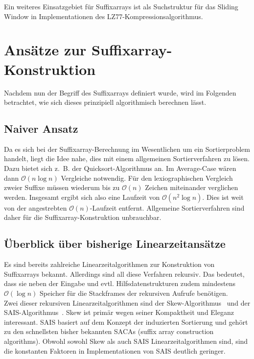 \documentclass[twoside,a4paper,11pt]{article}
\theoremstyle{break}
\begin{document}
Ein weiteres Einsatzgebiet für Suffixarrays ist als Suchstruktur für das Sliding Window in Implementationen des LZ77-Kompressionsalgorithmus.

\section{Ansätze zur Suffixarray-Konstruktion}

Nachdem nun der Begriff des Suffixarrays definiert wurde, wird im Folgenden betrachtet, wie sich dieses prinzipiell algorithmisch berechnen lässt.

\subsection{Naiver Ansatz}

Da es sich bei der Suffixarray-Berechnung im Wesentlichen um ein Sortierproblem handelt, liegt die Idee nahe, dies mit einem allgemeinen Sortierverfahren zu lösen. Dazu bietet sich z.~B. der Quicksort-Algorithmus an. Im Average-Case wären dann $\mathcal{O}(n \log n)$ Vergleiche notwendig. Für den lexiographischen Vergleich zweier Suffixe müssen wiederum bis zu $\mathcal{O}(n)$ Zeichen miteinander verglichen werden. Insgesamt ergibt sich also eine Laufzeit von $\mathcal{O}(n^2 \log n)$. Dies ist weit von der angestrebten $\mathcal{O}(n)$-Laufzeit entfernt. Allgemeine Sortierverfahren sind daher für die Suffixarray-Konstruktion unbrauchbar.

\subsection{Überblick über bisherige Linearzeitansätze}

Es sind bereits zahlreiche Linearzeitalgorithmen zur Konstruktion von Suffixarrays bekannt. Allerdings sind all diese Verfahren rekursiv. Das bedeutet, dass sie neben der Eingabe und evtl. Hilfsdatenstrukturen zudem mindestens $\mathcal{O}(\log n)$ Speicher für die Stackframes der rekursiven Aufrufe benötigen.\\

Zwei dieser rekursiven Linearzeitalgorithmen sind der Skew-Algorithmus~\cite{skew} und der SAIS-Algorithmus~\cite{sais}. Skew ist primär wegen seiner Kompaktheit und Eleganz interessant. SAIS basiert auf dem Konzept der induzierten Sortierung und gehört zu den schnellsten bisher bekannten SACAs (suffix array construction algorithms). Obwohl sowohl Skew als auch SAIS Linearzeitalgorithmen sind, sind die konstanten Faktoren in Implementationen von SAIS deutlich geringer.
\end{document}
